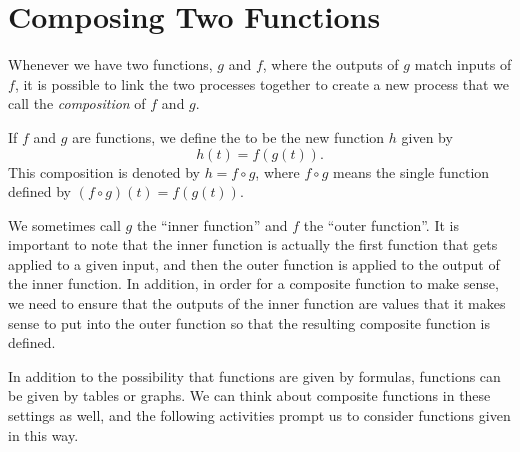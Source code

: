 \documentclass{ximera}
\begin{document}

\section{Composing Two Functions}

Whenever we have two functions, $g$ and $f$, where the outputs of $g$ match inputs of $f$, it is possible to link the two processes together to create a new process that we call the \emph{composition} of $f$ and $g$.

\begin{definition}
If $f$ and $g$ are functions, we define the  to be the new function $h$ given by
$$ h(t) = f(g(t)). $$
This composition is denoted by $h = f \circ g$, where $f \circ g$ means the single function defined by $(f \circ g)(t) = f(g(t))$.
\end{definition}

We sometimes call $g$ the ``inner function'' and $f$ the ``outer function''.  It is important to note that the inner function is actually the first function that gets applied to a given input, and then the outer function is applied to the output of the inner function.  In addition, in order for a composite function to make sense, we need to ensure that the outputs of the inner function are values that it makes sense to put into the outer function so that the resulting composite function is defined.

In addition to the possibility that functions are given by formulas, functions can be given by tables or graphs. We can think about composite functions in these settings as well, and the following activities prompt us to consider functions given in this way.
\end{document}
